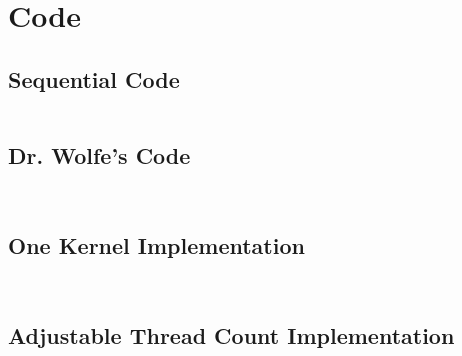 \documentclass[10pt]{article}
\begin{document}
\clearpage

\appendix
\section{Code}
\label{sec:code}


\subsection{Sequential Code}
\inputminted[linenos, fontsize=\footnotesize]{c}{../jacobi_final/seq_jacobi.c}

\subsection{Dr. Wolfe's Code}
\inputminted[linenos, fontsize=\footnotesize]{c}{../jacobi_final/original_jacobi5.cu}
\inputminted[linenos, fontsize=\footnotesize]{c}{../jacobi_final/original_jacobi6.cu}

\subsection{One Kernel Implementation}
\inputminted[linenos, fontsize=\footnotesize]{c}{../jacobi_final/1k_jacobi5.cu}
\inputminted[linenos, fontsize=\footnotesize]{c}{../jacobi_final/1k_jacobi6.cu}

\subsection{Adjustable Thread Count Implementation}
\inputminted[linenos, fontsize=\footnotesize]{c}{../jacobi_final/orig_J6M_v2.cu}
\inputminted[linenos, fontsize=\footnotesize]{c}{../jacobi_final/1k_J6M_v2.cu}
\end{document}
